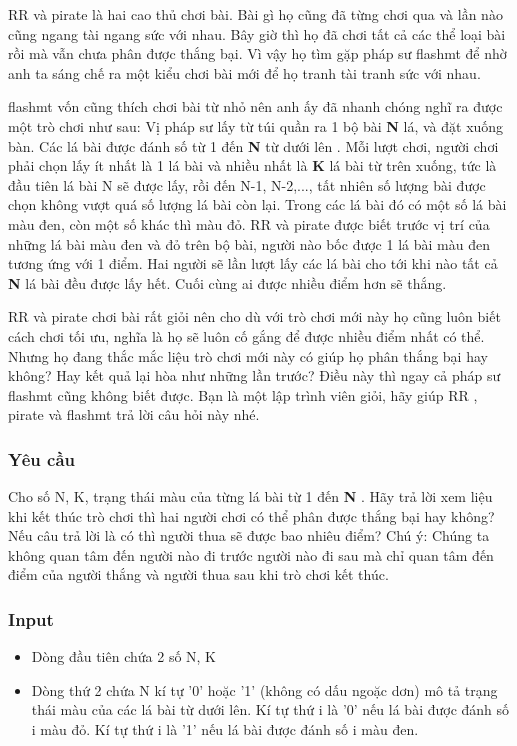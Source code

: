 



RR   và   pirate   là hai cao thủ chơi bài. Bài gì họ cũng đã từng chơi qua và lần nào cũng ngang tài ngang sức với nhau. Bây giờ thì họ đã chơi tất cả các thể loại bài rồi mà vẫn chưa phân được thắng bại. Vì vậy họ tìm gặp pháp sư   flashmt   để nhờ anh ta sáng chế ra một kiểu chơi bài mới để họ tranh tài tranh sức với nhau.  

flashmt   vốn cũng thích chơi bài từ nhỏ nên anh ấy đã nhanh chóng nghĩ ra được một trò chơi như sau: Vị pháp sư lấy từ túi quần ra 1 bộ bài   \textbf{    N   }   lá, và đặt xuống bàn.       Các lá bài được đánh số từ 1 đến    \textbf{     N    }    từ dưới lên      . Mỗi lượt chơi, người chơi phải chọn lấy ít nhất là 1 lá bài và nhiều nhất là   \textbf{    K   }   lá bài từ trên xuống, tức là đầu tiên lá bài N sẽ được lấy, rồi đến N-1, N-2,..., tất nhiên số lượng bài được chọn không vượt quá số lượng lá bài còn lại. Trong các lá bài đó có một số lá bài màu đen, còn một số khác thì màu đỏ.   RR   và   pirate   được biết trước vị trí của những lá bài màu đen và đỏ trên bộ bài, người nào bốc được 1 lá bài màu đen tương ứng với 1 điểm. Hai người sẽ lần lượt lấy các lá bài cho tới khi nào tất cả   \textbf{    N   }   lá bài đều được lấy hết. Cuối cùng ai được nhiều điểm hơn sẽ thắng.  

RR   và   pirate   chơi bài rất giỏi nên cho dù với trò chơi mới này họ cũng luôn biết cách chơi tối ưu, nghĩa là họ sẽ luôn cố gắng để được nhiều điểm nhất có thể. Nhưng họ đang thắc mắc liệu trò chơi mới này có giúp họ phân thắng bại hay không? Hay kết quả lại hòa như những lần trước? Điều này thì ngay cả pháp sư   flashmt   cũng không biết được. Bạn là một lập trình viên giỏi, hãy giúp   RR   ,   pirate   và   flashmt   trả lời câu hỏi này nhé.  

\subsubsection{\textbf{    Yêu cầu   }}

   Cho số N, K, trạng thái màu của từng lá bài từ 1 đến   \textbf{    N   }   . Hãy trả lời xem liệu khi kết thúc trò chơi thì hai người chơi có thể phân được thắng bại hay không? Nếu câu trả lời là có thì người       thua      sẽ được bao nhiêu điểm? Chú ý: Chúng ta không quan tâm đến người nào đi trước người nào đi sau mà chỉ quan tâm đến điểm của người thắng và người thua sau khi trò chơi kết thúc.  

\subsubsection{   Input  }
\begin{itemize}
	\item     Dòng đầu tiên chứa 2 số N, K   
	\item     Dòng thứ 2 chứa N kí tự '0' hoặc '1' (không có dấu ngoặc dơn) mô tả trạng thái màu của các lá bài từ dưới lên. Kí tự thứ i là '0' nếu lá bài được đánh số i màu đỏ. Kí tự thứ i là '1' nếu lá bài được đánh số i màu đen.   
\end{itemize}

